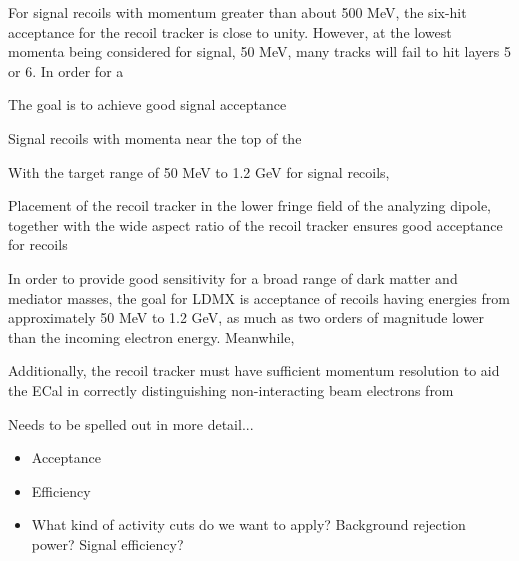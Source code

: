 For signal recoils with momentum greater than about 500 MeV, the six-hit acceptance for the recoil tracker is close to unity.  However, at the lowest momenta being considered for signal, 50 MeV, many  tracks will fail to hit layers 5 or 6.  In order for a


The goal is to achieve good signal acceptance



Signal recoils with momenta near the top of the 

With the target range of 50 MeV to 1.2 GeV for signal recoils, 





Placement of the recoil tracker in the lower fringe field of the analyzing dipole, together with the wide aspect ratio of the recoil tracker ensures good acceptance for recoils








In order to provide good sensitivity for a broad range of dark matter and mediator masses, the goal for LDMX is acceptance of recoils having energies from approximately 50 MeV to 1.2 GeV, as much as two orders of magnitude lower than the incoming electron energy.  Meanwhile, 



 Additionally, the recoil tracker must have sufficient momentum resolution to aid the ECal in correctly distinguishing non-interacting beam electrons from



Needs to be spelled out in more detail...
\begin{itemize}
    \item Acceptance
    \item Efficiency 
    \item What kind of activity cuts do we want to apply?  Background rejection
        power?  Signal efficiency? 
\end{itemize}




